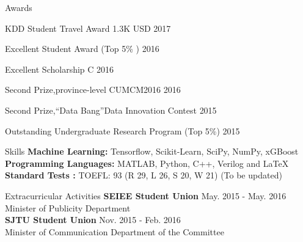 \documentclass{resume} %
\begin{document}

\begin{rSection}{Awards}
\begin{rSubsection}{}{}{}{}
\item KDD Student Travel Award \hfill{1.3K USD 2017}
\item Excellent Student Award (Top 5\% )  \hfill{2016}
\item Excellent Scholarship C \hfill{2016}
\item Second Prize,province-level CUMCM2016 \hfill{2016}
\item Second Prize,``Data Bang''Data Innovation Contest \hfill{2015} 
\item Outstanding Undergraduate Research Program (Top 5\%) \hfill{2015}
\end{rSubsection}
\end{rSection}

\begin{rSection}{Skills}
{\bf Machine Learning: }
\hspace*{3.0 cm} Tensorflow, Scikit-Learn, SciPy, NumPy, xGBoost\\
{\bf Programming Languages: }
\hspace*{1.8 cm} MATLAB, Python, C++, Verilog and \LaTeX  \\
{\bf Standard Tests : }
\hspace*{3.4 cm} TOEFL: 93 (R 29, L 26, S 20, W 21)  (To be updated)
\end{rSection}
\begin{rSection}{Extracurricular Activities}
\textbf{SEIEE Student Union} \hfill{May. 2015 - May. 2016}\\
Minister of Publicity Department  \\
\textbf{SJTU Student Union} \hfill{Nov. 2015 - Feb. 2016}\\
Minister of Communication Department of the Committee 
\end{rSection}
\clearpage
\end{document}
